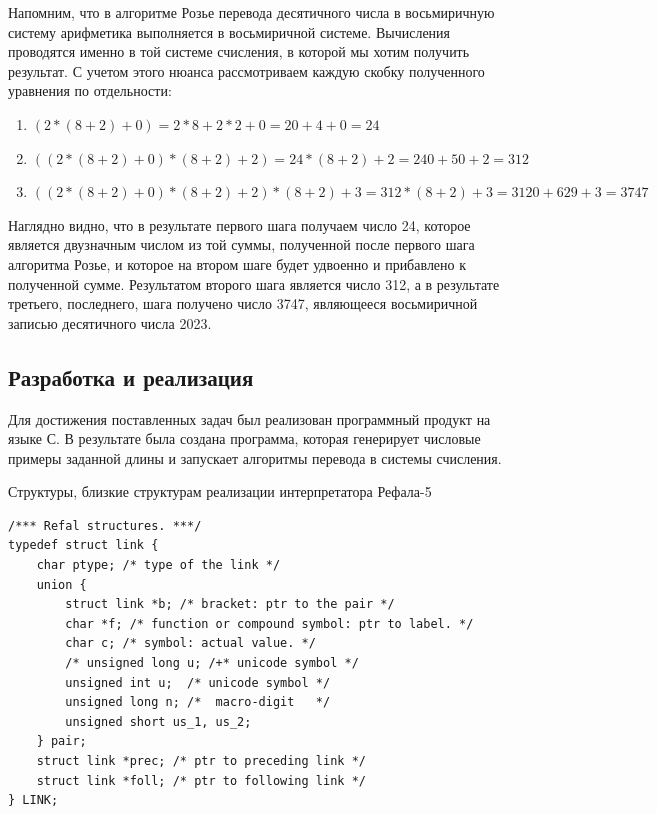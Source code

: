 \documentclass[14pt, russian]{scrartcl}
\begin{document}
Напомним, что в алгоритме Розье перевода десятичного числа в восьмиричную систему арифметика выполняется в восьмиричной системе. Вычисления проводятся именно в той системе счисления, в которой мы хотим получить результат. С учетом этого нюанса рассмотриваем каждую скобку полученного уравнения по отдельности:
\begin{enumerate}
    \item $(2 * (8+2) + 0) = 2 * 8 + 2 * 2 + 0 = 20 + 4 + 0 = 24$
    \item $((2 * (8+2) + 0)*(8+2) + 2) = 24 *(8+2) + 2 = 240 + 50 + 2 = 312$
    \item $((2 * (8+2) + 0)*(8+2) + 2) * (8+2) + 3 = 312 * (8 + 2) + 3 = 3120 + 629 + 3 = 3747$
\end{enumerate}
Наглядно видно, что в результате первого шага получаем число 24, которое является двузначным числом из той суммы, полученной после первого шага алгоритма Розье, и которое на втором шаге будет удвоенно и прибавлено к полученной сумме. Результатом второго шага является число 312, а в результате третьего, последнего, шага получено число 3747, являющееся восьмиричной записью десятичного числа 2023.

\subsection{Разработка и реализация}
Для достижения поставленных задач был реализован программный продукт на языке С. В результате была создана программа, которая генерирует числовые примеры заданной длины и запускает алгоритмы перевода в системы счисления.
\begin{listing}
\caption{Структуры, близкие структурам реализации интерпретатора Рефала-5}
\label{lst:refal}
\begin{verbatim}
/*** Refal structures. ***/
typedef struct link {
    char ptype; /* type of the link */  
    union {
        struct link *b; /* bracket: ptr to the pair */
        char *f; /* function or compound symbol: ptr to label. */
        char c; /* symbol: actual value. */
        /* unsigned long u; /+* unicode symbol */
        unsigned int u;  /* unicode symbol */
        unsigned long n; /*  macro-digit   */
        unsigned short us_1, us_2;
    } pair;
    struct link *prec; /* ptr to preceding link */
    struct link *foll; /* ptr to following link */
} LINK;
\end{verbatim}
\end{listing}
\end{document}
